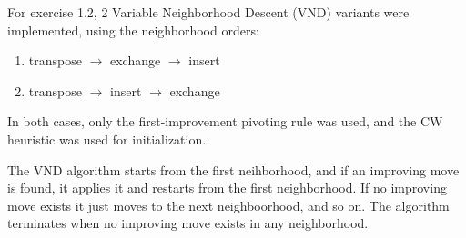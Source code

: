 For exercise 1.2, 2 Variable Neighborhood Descent (VND) variants were implemented, using the neighborhood orders:

\begin{enumerate}[leftmargin=1.5em]
    \item transpose \(\rightarrow\) exchange \(\rightarrow\) insert
    \item transpose \(\rightarrow\) insert \(\rightarrow\) exchange
\end{enumerate}

In both cases, only the first-improvement pivoting rule was used, and the CW heuristic was used for initialization.

The VND algorithm starts from the first neihborhood, and if an improving move is found, it applies it and restarts from the first neighborhood. If no improving move exists it just moves to the next neighboorhood, and so on. The algorithm terminates when no improving move exists in any neighborhood.